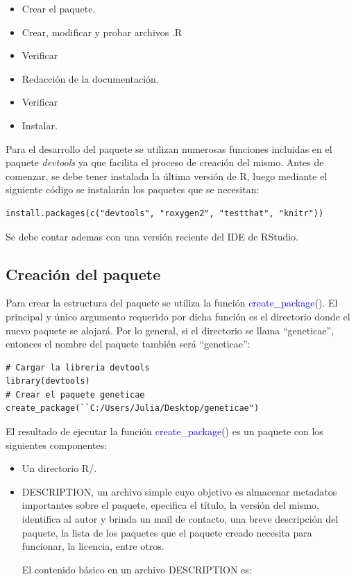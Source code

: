 \begin{itemize}
\item Crear el paquete.
\item Crear, modificar y probar archivos .R
\item Verificar 
\item Redacción de la documentación.
\item Verificar 
\item Instalar.
\end{itemize}

Para el desarrollo del paquete se utilizan numerosas funciones incluidas en el paquete \emph{devtools} \citep{Hadley2019} ya que facilita el proceso de creación del mismo. Antes de comenzar, se debe tener instalada la última versión de R, luego mediante el siguiente código se instalarán los paquetes que se necesitan:

\begin{lstlisting}
install.packages(c("devtools", "roxygen2", "testthat", "knitr"))
\end{lstlisting}

Se debe contar ademas con una versión reciente del IDE de RStudio. 

\subsection{Creación del paquete}

Para crear la estructura del paquete se utiliza la función \textcolor{blue}{create\_package}(). El principal y único argumento requerido por dicha función es el directorio donde el nuevo paquete se alojará. Por lo general, si el directorio se llama ``geneticae'', entonces el nombre del paquete también será ``geneticae'':


\begin{lstlisting}
# Cargar la libreria devtools
library(devtools)
# Crear el paquete geneticae
create_package(``C:/Users/Julia/Desktop/geneticae")
\end{lstlisting}


El resultado de ejecutar la función \textcolor{blue}{create\_package}() es un paquete con los siguientes componentes:
\begin{itemize}
\item Un directorio R/.
\end{itemize}
\begin{itemize}
\item DESCRIPTION, un archivo simple cuyo objetivo es almacenar metadatos importantes sobre el paquete, epecifica el título, la versión del mismo, identifica al autor y brinda un mail de contacto, una breve descripción del paquete, la lista de los paquetes que el paquete creado necesita para funcionar, la licencia, entre otros.

El contenido básico en un archivo DESCRIPTION es:
\end{itemize}

